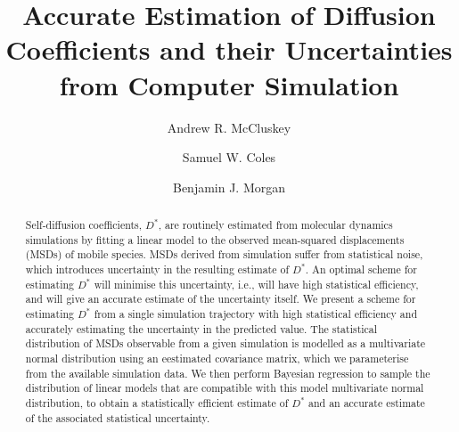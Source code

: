 \documentclass[reprint,superscriptaddress,nobibnotes,amsmath,amssymb,aps,prx,hidelinks,linenumbers]{revtex4-2}
\title@column\titleblock@produce
\makeatletter
\newcommand{\papertitle}{Accurate Estimation of Diffusion Coefficients and their Uncertainties from Computer Simulation}
\newcommand{\D}{\ensuremath{D^*}}
\def\maketitle{
\@author@finish
\title@column\titleblock@produce
\suppressfloats[t]}
\makeatother
\begin{document}
\let\oldaddcontentsline\addcontentsline%
\renewcommand{\addcontentsline}[3]{}

\title{\papertitle}

\author{Andrew R. McCluskey}
\author{Samuel W. Coles}
\author{Benjamin J. Morgan}

\begin{abstract}
    Self-diffusion coefficients, $\D$, are routinely estimated from molecular dynamics simulations by fitting a linear model to the observed mean-squared displacements (MSDs) of mobile species.
    MSDs derived from simulation suffer from statistical noise, which introduces uncertainty in the resulting estimate of $\D$.
    An optimal scheme for estimating $\D$ will minimise this uncertainty, i.e., will have high statistical efficiency, and will give an accurate estimate of the uncertainty itself.
    We present a scheme for estimating $\D$ from a single simulation trajectory with high statistical efficiency and accurately estimating the uncertainty in the predicted value.
    The statistical distribution of MSDs observable from a given simulation is modelled as a multivariate normal distribution using an eestimated covariance matrix, which we parameterise from the available simulation data. 
    We then perform Bayesian regression to sample the distribution of linear models that are compatible with this model multivariate normal distribution, to obtain a statistically efficient estimate of $D^*$ and an accurate estimate of the associated statistical uncertainty.
\end{abstract}

\maketitle 
\end{document}
